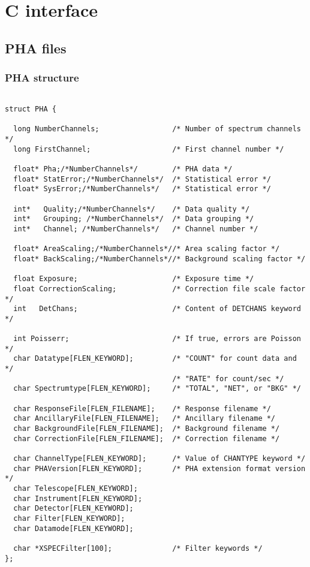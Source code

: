 \documentclass[11pt]{book}
\begin{document}

\chapter{C interface}

\section{PHA files}

\subsection{PHA structure}

\begin{verbatim}

struct PHA {

  long NumberChannels;                 /* Number of spectrum channels */
  long FirstChannel;                   /* First channel number */

  float* Pha;/*NumberChannels*/        /* PHA data */
  float* StatError;/*NumberChannels*/  /* Statistical error */
  float* SysError;/*NumberChannels*/   /* Statistical error */

  int*   Quality;/*NumberChannels*/    /* Data quality */
  int*   Grouping; /*NumberChannels*/  /* Data grouping */
  int*   Channel; /*NumberChannels*/   /* Channel number */

  float* AreaScaling;/*NumberChannels*//* Area scaling factor */
  float* BackScaling;/*NumberChannels*//* Background scaling factor */

  float Exposure;                      /* Exposure time */
  float CorrectionScaling;             /* Correction file scale factor */
  int   DetChans;                      /* Content of DETCHANS keyword */

  int Poisserr;                        /* If true, errors are Poisson */
  char Datatype[FLEN_KEYWORD];         /* "COUNT" for count data and */
                                       /* "RATE" for count/sec */
  char Spectrumtype[FLEN_KEYWORD];     /* "TOTAL", "NET", or "BKG" */

  char ResponseFile[FLEN_FILENAME];    /* Response filename */
  char AncillaryFile[FLEN_FILENAME];   /* Ancillary filename */
  char BackgroundFile[FLEN_FILENAME];  /* Background filename */
  char CorrectionFile[FLEN_FILENAME];  /* Correction filename */

  char ChannelType[FLEN_KEYWORD];      /* Value of CHANTYPE keyword */
  char PHAVersion[FLEN_KEYWORD];       /* PHA extension format version */
  char Telescope[FLEN_KEYWORD];                             
  char Instrument[FLEN_KEYWORD];
  char Detector[FLEN_KEYWORD];
  char Filter[FLEN_KEYWORD];
  char Datamode[FLEN_KEYWORD];

  char *XSPECFilter[100];              /* Filter keywords */
};

\end{verbatim}
\end{document}
